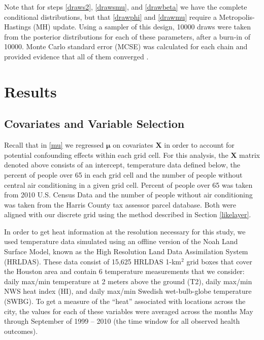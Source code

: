 \documentclass[final]{statsoc}
\begin{document}
Note that for steps \ref{draws2}, \ref{drawsmu}, and \ref{drawbeta} we have the complete conditional distributions, but that \ref{drawphi} and \ref{drawmu} require a Metropolis-Hastings (MH) update. Using a sampler of this design, 10000 draws were taken from the posterior distributions for each of these parameters, after a burn-in of 10000. Monte Carlo standard error (MCSE) was calculated for each chain and provided evidence that all of them converged \citep{Flegal2015}. 


\section{Results}\label{results}

\subsection{Covariates and Variable Selection}\label{sec:temp_data}
Recall that in \eqref{mu} we regressed $\boldsymbol{\mu}$ on covariates $\mathbf{X}$ in order to account for potential confounding effects within each grid cell.   For this analysis, the $\mathbf{X}$ matrix denoted above consists of an intercept, temperature data defined below, the percent of people over 65 in each grid cell and the number of people without central air conditioning in a given grid cell. Percent of people over 65 was taken from 2010 U.S. Census Data and the number of people without air conditioning was taken from the Harris County tax assessor parcel database. Both were aligned with our discrete grid using the method described in Section \ref{likelayer}. 

In order to get heat information at the resolution necessary for this
study, we used temperature data simulated using an offline version of the 
Noah Land Surface Model, known as the High Resolution Land Data Assimilation 
System (HRLDAS).
These data consist of 15,625 HRLDAS 1-km$^2$ grid boxes that cover the Houston
area and contain 6 temperature measurements that we consider: daily max/min 
temperature at 2 meters above the ground (T2), daily max/min NWS heat index (HI), and
daily max/min Swedish wet-bulb-globe temperature (SWBG). To get a measure of the 
``heat'' associated with locations across the city, the values for each of 
these variables were averaged across the months May through September of 
1999 -- 2010 (the time window for all observed health outcomes). 
\end{document}
